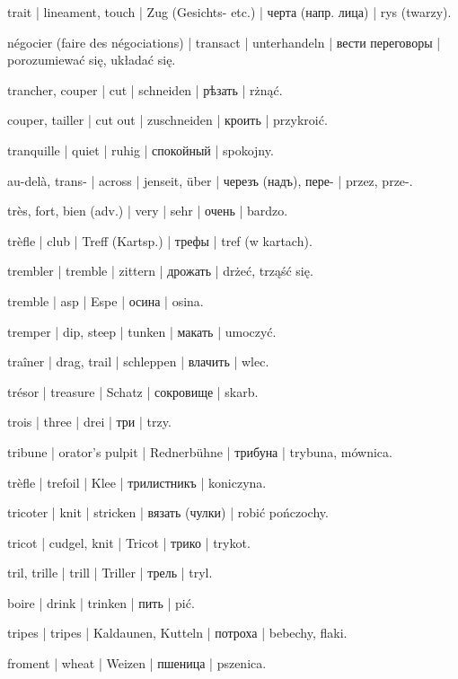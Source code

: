 \begin{outdent}{1em}
trait | lineament, touch | Zug (Gesichts- etc.) | черта
(напр. лица) | rys (twarzy).

négocier (faire des négociations) | transact | unterhandeln | вести переговоры | porozumiewać się, układać się.

trancher, couper | cut | schneiden | рѣзать | rżnąć.

\uvsubentry{}
couper, tailler | cut out | zuschneiden | кроить | przykroić.

tranquille | quiet | ruhig | спокойный | spokojny.

au-delà, trans- | across | jenseit, über | черезъ (надъ),
пере- | przez, prze-.

très, fort, bien (adv.) | very | sehr | очень | bardzo.

trèfle | club | Treff (Kartsp.) | трефы | tref (w kartach).

trembler | tremble | zittern | дрожать | drżeć, trząść się.

tremble | asp | Espe | осина | osina.

tremper | dip, steep | tunken | макать | umoczyć.

traîner | drag, trail | schleppen | влачить | wlec.

trésor | treasure | Schatz | сокровище | skarb.

trois | three | drei | три | trzy.

tribune | orator’s pulpit | Rednerbühne | трибуна | trybuna,
mównica.

\uvsubentry{}
trèfle | trefoil | Klee | трилистникъ | koniczyna.

tricoter | knit | stricken | вязать (чулки) | robić
pończochy.

tricot | cudgel, knit | Tricot | трико | trykot.

tril, trille | trill | Triller | трель | tryl.

boire | drink | trinken | пить | pić.

tripes | tripes | Kaldaunen, Kutteln | потроха | bebechy, flaki.

froment | wheat | Weizen | пшеница | pszenica.


\end{outdent}
